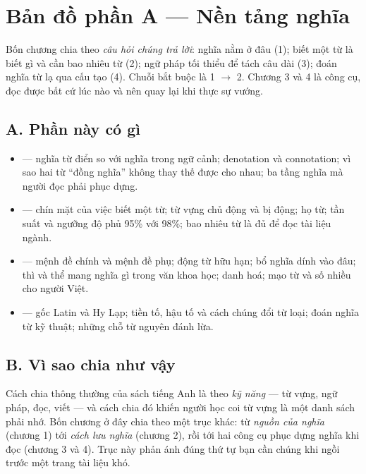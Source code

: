 \documentclass[../english.tex]{subfiles}
\begin{document}
\section*{Bản đồ phần A --- Nền tảng nghĩa}

\begin{tomtat}
Bốn chương chia theo \emph{câu hỏi chúng trả lời}: nghĩa nằm ở đâu (1); biết một từ là biết gì và cần bao nhiêu từ (2); ngữ pháp tối thiểu để tách câu dài (3); đoán nghĩa từ lạ qua cấu tạo (4). Chuỗi bắt buộc là 1 \(\rightarrow\) 2. Chương 3 và 4 là công cụ, đọc được bất cứ lúc nào và nên quay lại khi thực sự vướng.
\end{tomtat}

\subsection*{A. Phần này có gì}
\begin{itemize}
\item \textbf{} --- nghĩa từ điển so với nghĩa trong ngữ cảnh; denotation và connotation; vì sao hai từ ``đồng nghĩa'' không thay thế được cho nhau; ba tầng nghĩa mà người đọc phải phục dựng.
\item \textbf{} --- chín mặt của việc biết một từ; từ vựng chủ động và bị động; họ từ; tần suất và ngưỡng độ phủ 95\% với 98\%; bao nhiêu từ là đủ để đọc tài liệu ngành.
\item \textbf{} --- mệnh đề chính và mệnh đề phụ; động từ hữu hạn; bổ nghĩa dính vào đâu; thì và thể mang nghĩa gì trong văn khoa học; danh hoá; mạo từ và số nhiều cho người Việt.
\item \textbf{} --- gốc Latin và Hy Lạp; tiền tố, hậu tố và cách chúng đổi từ loại; đoán nghĩa từ kỹ thuật; những chỗ từ nguyên đánh lừa.
\end{itemize}

\subsection*{B. Vì sao chia như vậy}
Cách chia thông thường của sách tiếng Anh là theo \emph{kỹ năng} --- từ vựng, ngữ pháp, đọc, viết --- và cách chia đó khiến người học coi từ vựng là một danh sách phải nhớ. Bốn chương ở đây chia theo một trục khác: từ \emph{nguồn của nghĩa} (chương 1) tới \emph{cách lưu nghĩa} (chương 2), rồi tới hai công cụ phục dựng nghĩa khi đọc (chương 3 và 4). Trục này phản ánh đúng thứ tự bạn cần chúng khi ngồi trước một trang tài liệu khó.
\end{document}
